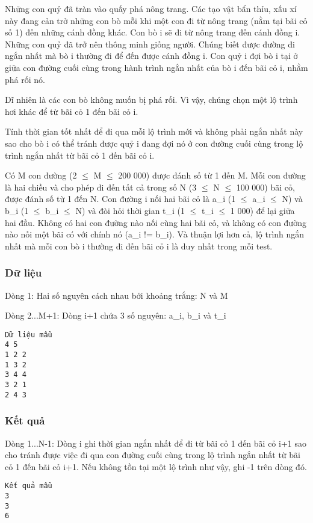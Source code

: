 



   Những con quỷ đã tràn vào quấy phá nông trang. Các tạo vật bẩn thỉu, xấu xí này đang cản trở những con bò mỗi khi một con đi từ nông trang (nằm tại bãi cỏ số 1) đến những cánh đồng khác. Con bò i sẽ đi từ nông trang đến cánh đồng i. Những con quỷ đã trở nên thông minh giống người. Chúng biết được đường đi ngắn nhất mà bò i thường đi để đến được cánh đồng i. Con quỷ i đợi bò i tại ở giữa con đường cuối cùng trong hành trình ngắn nhất của bò i đến bãi cỏ i, nhằm phá rối nó.  

   Dĩ nhiên là các con bò không muốn bị phá rối. Vì vậy, chúng chọn một lộ trình hơi khác để từ bãi cỏ 1 đến bãi cỏ i.  

   Tính thời gian tốt nhất để đi qua mỗi lộ trình mới và không phải ngắn nhất này sao cho bò i có thể tránh được quỷ i đang đợi nó ở con đường cuối cùng trong lộ trình ngắn nhất từ bãi cỏ 1 đến bãi cỏ i.  

   Có M con đường (2  $\le$  M  $\le$  200 000) được đánh số từ 1 đến M. Mỗi con đường là hai chiều và cho phép đi đến tất cả trong số N (3  $\le$  N  $\le$  100 000) bãi cỏ, được đánh số từ 1 đến N. Con đường i nối hai bãi cỏ là a\_i (1  $\le$  a\_i  $\le$  N) và b\_i (1  $\le$  b\_i  $\le$  N) và đòi hỏi thời gian t\_i (1  $\le$  t\_i  $\le$  1 000) để lại giữa hai đầu. Không có hai con đường nào nối cùng hai bãi cỏ, và không có con đường nào nối một bãi có với chính nó (a\_i != b\_i). Và thuận lợi hơn cả, lộ trình ngắn nhất mà mỗi con bò i thường đi đến bãi cỏ i là duy nhất trong mỗi test.  

\subsubsection{   Dữ liệu  }

   Dòng 1: Hai số nguyên cách nhau bởi khoảng trắng: N và M  

   Dòng 2...M+1: Dòng i+1 chứa 3 số nguyên: a\_i, b\_i và t\_i  
\begin{verbatim}
Dữ liệu mẫu
4 5
1 2 2
1 3 2
3 4 4
3 2 1
2 4 3
\end{verbatim}

\subsubsection{   Kết quả  }

   Dòng 1...N-1: Dòng i ghi thời gian ngắn nhất để đi từ bãi cỏ 1 đến bãi cỏ i+1 sao cho tránh được việc đi qua con đường cuối cùng trong lộ trình ngắn nhất từ bãi cỏ 1 đến bãi cỏ i+1. Nếu không tồn tại một lộ trình như vậy, ghi -1 trên dòng đó.  
\begin{verbatim}
Kết quả mẫu
3
3
6
\end{verbatim}
